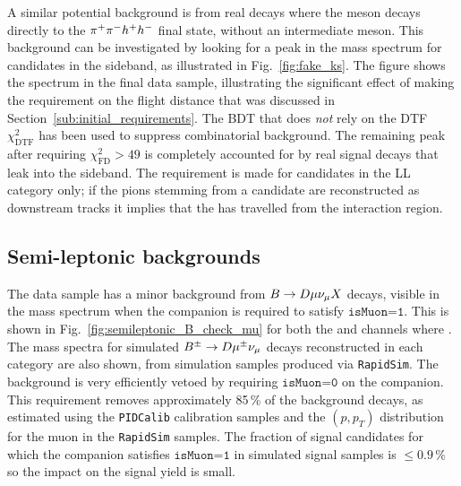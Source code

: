 A similar potential background is from real \BtoDh decays where the \D meson decays directly to the ${{\pi}^+}{{\pi}^-} h^+ h^-$ final state, without an intermediate \KS meson. This background can be investigated by looking for a peak in the \B mass spectrum for candidates in the \KS sideband, as illustrated in Fig.~\ref{fig:fake_ks}. The figure shows the spectrum in the final data sample, illustrating the significant effect of making the requirement on the \KS flight distance that was discussed in Section~\ref{sub:initial_requirements}. The BDT that does \emph{not} rely on the DTF $\chi^2_\mathrm{DTF}$ has been used to suppress combinatorial background. The remaining peak after requiring $\chi^2_\text{FD}>49$ is completely accounted for by real signal decays that leak into the \KS sideband. The requirement is made for candidates in the LL category only; if the pions stemming from a \KS candidate are reconstructed as downstream tracks it implies that the \KS has travelled from the interaction region.


\subsection{Semi-leptonic backgrounds} %
\label{sub:semi_leptonic_backgrounds}



The data sample has a minor background from ${B}\rightarrow{\ensuremath{D}}\mu\nu_\mu X$ decays, visible in the \B mass spectrum when the companion is required to satisfy $\texttt{isMuon=1}$.  This is shown in Fig.~\ref{fig:semileptonic_B_check_mu} for both the \BtoDK and \BtoDpi channels where \DtoKspipi. The \B mass spectra for simulated ${{B}^\pm}\rightarrow{\ensuremath{D}}{\ensuremath{\mu^\pm}}\nu_\mu$ decays reconstructed in each category are also shown, from simulation samples produced via \texttt{RapidSim}. The background is very efficiently vetoed by requiring $\texttt{isMuon=0}$ on the companion. This requirement removes approximately 85\,\% of the background decays, as estimated using the \texttt{PIDCalib} calibration samples and the $(p, p_T)$ distribution for the muon in the \texttt{RapidSim} samples. The fraction of signal candidates for which the companion satisfies $\texttt{isMuon=1}$ in simulated signal samples is $\leq 0.9\,\%$ so the impact on the signal yield is small.

